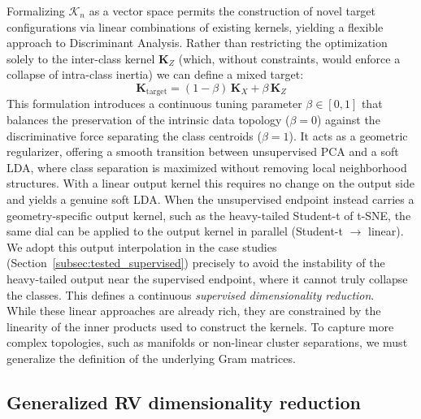 \documentclass[11pt]{article}
\begin{document}
	Formalizing $\mathcal{K}_n$ as a vector space permits the construction of novel target configurations via linear combinations of existing kernels, yielding a flexible approach to Discriminant Analysis. Rather than restricting the optimization solely to the inter-class kernel $\mathbf{K}_Z$ (which, without constraints, would enforce a collapse of intra-class inertia) we can define a mixed target:
	\begin{equation}
		\mathbf{K}_\text{target} = (1 - \beta)\,\mathbf{K}_X + \beta\,\mathbf{K}_Z
	\end{equation}
	This formulation introduces a continuous tuning parameter $\beta \in [0, 1]$ that balances the preservation of the intrinsic data topology ($\beta=0$) against the discriminative force separating the class centroids ($\beta=1$). It acts as a geometric regularizer, offering a smooth transition between unsupervised PCA and a soft LDA, where class separation is maximized without removing local neighborhood structures. With a linear output kernel this requires no change on the output side and yields a genuine soft LDA. When the unsupervised endpoint instead carries a geometry-specific output kernel, such as the heavy-tailed Student-t of t-SNE, the same dial can be applied to the output kernel in parallel (Student-t $\to$ linear). We adopt this output interpolation in the case studies (Section~\ref{subsec:tested_supervised}) precisely to avoid the instability of the heavy-tailed output near the supervised endpoint, where it cannot truly collapse the classes. This defines a continuous \emph{supervised dimensionality reduction}.\\
	
	While these linear approaches are already rich, they are constrained by the linearity of the inner products used to construct the kernels. To capture more complex topologies, such as manifolds or non-linear cluster separations, we must generalize the definition of the underlying Gram matrices.
	
	
	
	\subsection{Generalized RV dimensionality reduction}
	
\end{document}
